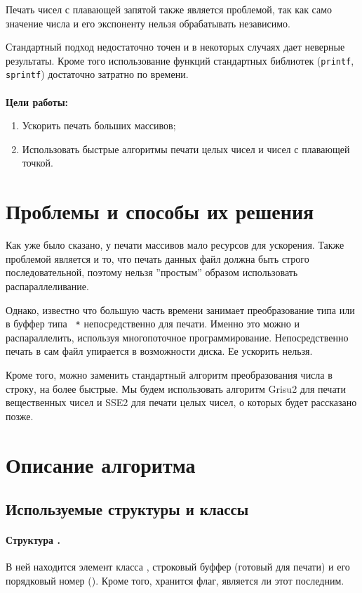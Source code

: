 \documentclass[a4paper, 12pt, twoside]{article}
\begin{document}
Печать чисел с плавающей запятой также является проблемой, так как само значение числа и его экспоненту нельзя обрабатывать независимо. 

Стандартный подход недостаточно точен и в некоторых случаях дает неверные результаты. 
Кроме того использование функций стандартных библиотек (\texttt{printf}, \texttt{sprintf}) достаточно затратно по времени.
\\
\\
\textbf{Цели работы:}
\begin{enumerate}
\item Ускорить печать больших массивов;
\item Использовать быстрые алгоритмы печати целых чисел и чисел с плавающей точкой.
\end{enumerate}

\section{Проблемы и способы их решения}
Как уже было сказано, у печати массивов мало ресурсов для ускорения.
Также проблемой является и то, что печать данных файл должна быть строго последовательной, поэтому нельзя ''простым'' образом использовать распараллеливание.

Однако, известно что большую часть времени занимает преобразование типа \texttt{} или \texttt{} в буффер типа \texttt{ *} непосредственно для печати.
Именно это можно и распараллелить, используя многопоточное программирование.
Непосредственно печать в сам файл упирается в возможности диска. 
Ее ускорить нельзя.

Кроме того, можно заменить стандартный алгоритм преобразования числа в строку, на более быстрые.
Мы будем использовать алгоритм \textsf{Grisu2} для печати вещественных чисел и \textsf{SSE2} для печати целых чисел, о которых будет рассказано позже.


\section{Описание алгоритма}
\subsection{Используемые структуры и классы}
\paragraph{Структура \texttt{}.}
В ней находится элемент класса \texttt{}, строковый буффер (готовый для печати) и его порядковый номер (\texttt{}).
Кроме того, хранится флаг, является ли этот \texttt{} последним.
\end{document}
